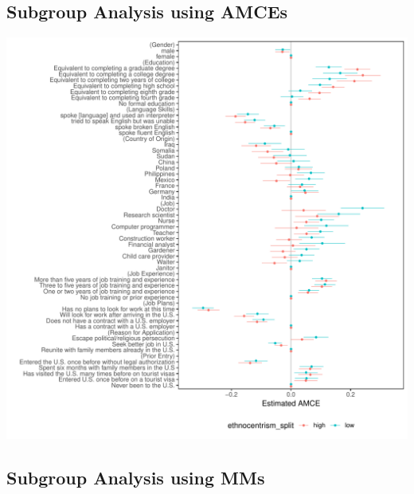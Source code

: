 \documentclass[a4paper,12pt]{article}\usepackage[]{graphicx}\usepackage[]{color}
\makeatletter
\def\maxwidth{ %
  \ifdim\Gin@nat@width>\linewidth
    \linewidth
  \else
    \Gin@nat@width
  \fi
}
\newenvironment{knitrout}{}{} %
\makeatother
\begin{document}
\clearpage

\subsection{Subgroup Analysis using AMCEs}

\begin{knitrout}
\color{fgcolor}
\includegraphics[width=\maxwidth]{figure/hainmueller_immigration_subgroup_amce_appendix-1} 

\end{knitrout}

\clearpage

\subsection{Subgroup Analysis using MMs}
\end{document}
